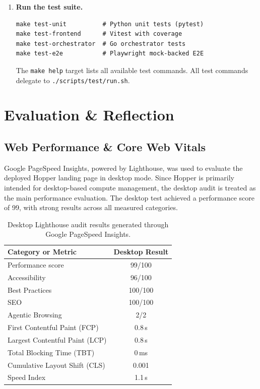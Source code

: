 \documentclass[12pt,a4paper]{article}
\begin{document}
\begin{enumerate}[leftmargin=1.5em]
  \item \textbf{Run the test suite.}
\begin{lstlisting}
make test-unit          # Python unit tests (pytest)
make test-frontend      # Vitest with coverage
make test-orchestrator  # Go orchestrator tests
make test-e2e           # Playwright mock-backed E2E
\end{lstlisting}
    The \texttt{make help} target lists all available test commands.
    All test commands delegate to \texttt{./scripts/test/run.sh}.

\end{enumerate}

\section{Evaluation \& Reflection}

\subsection{Web Performance \& Core Web Vitals}

Google PageSpeed Insights, powered by Lighthouse, was used to evaluate the
deployed Hopper landing page in desktop mode.
Since Hopper is primarily intended for desktop-based compute management, the desktop
audit is treated as the main performance evaluation. The desktop test achieved a
performance score of 99, with strong results across all measured categories.

\begin{table}[!htbp]
\centering
\caption{Desktop Lighthouse audit results generated through Google PageSpeed Insights.}
\label{tab:desktop-pagespeed}
\renewcommand{\arraystretch}{1.2}

\begin{tabular}{lc}
\toprule
\textbf{Category or Metric} & \textbf{Desktop Result} \\
\midrule
Performance score & 99/100 \\
Accessibility & 96/100 \\
Best Practices & 100/100 \\
SEO & 100/100 \\
Agentic Browsing & 2/2 \\
\midrule
First Contentful Paint (FCP) & 0.8\,s \\
Largest Contentful Paint (LCP) & 0.8\,s \\
Total Blocking Time (TBT) & 0\,ms \\
Cumulative Layout Shift (CLS) & 0.001 \\
Speed Index & 1.1\,s \\
\bottomrule
\end{tabular}
\end{table}
\end{document}
